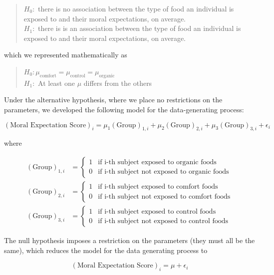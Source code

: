 \documentclass[
]{book}
\theoremstyle{plain}
\theoremstyle{mydefn}
\theoremstyle{myexmpl}
\theoremstyle{remark}
\begin{document}
\begin{quote}
\(H_0:\) there is no association between the type of food an individual is exposed to and their moral expectations, on average.\\
\(H_1:\) there is is an association between the type of food an individual is exposed to and their moral expectations, on average.
\end{quote}

which we represented mathematically as

\begin{quote}
\(H_0: \mu_{\text{comfort}} = \mu_{\text{control}} = \mu_{\text{organic}}\)\\
\(H_1:\) At least one \(\mu\) differs from the others
\end{quote}

Under the alternative hypothesis, where we place no restrictions on the parameters, we developed the following model for the data-generating process:

\[(\text{Moral Expectation Score})_i = \mu_1 (\text{Group})_{1,i} + \mu_2 (\text{Group})_{2,i} + \mu_3 (\text{Group})_{3,i} + \epsilon_i\]

where

\[
\begin{aligned}
  (\text{Group})_{1,i} &= \begin{cases}
    1 & \text{if i-th subject exposed to organic foods} \\
    0 & \text{if i-th subject not exposed to organic foods} 
    \end{cases} \\
  (\text{Group})_{2,i} &= \begin{cases}
    1 & \text{if i-th subject exposed to comfort foods} \\
    0 & \text{if i-th subject not exposed to comfort foods} 
    \end{cases} \\
  (\text{Group})_{3,i} &= \begin{cases}
    1 & \text{if i-th subject exposed to control foods} \\
    0 & \text{if i-th subject not exposed to control foods}
    \end{cases}
\end{aligned}
\]

The null hypothesis imposes a restriction on the parameters (they must all be the same), which reduces the model for the data generating process to

\[(\text{Moral Expectation Score})_i = \mu + \epsilon_i\]
\end{document}
